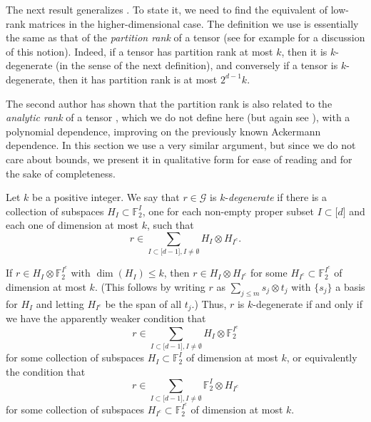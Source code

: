 \documentclass{toc}
\newcommand\F{\mathbb{F}}
\newcommand \cG{\mathcal G}
\newcommand \s{\subset}
\begin{document}
The next result generalizes . To state it, we need to find the equivalent of low-rank matrices in the higher-dimensional case. The definition we use is essentially the same as that of the \emph{partition rank} of a tensor (see for example \cite{lovett} for a discussion of this notion). Indeed, if a tensor has partition rank at most $k$, then it is $k$-degenerate (in the sense of the next definition), and conversely if a tensor is $k$-degenerate, then it has partition rank is at most $2^{d-1}k$.

The second author has shown that the partition rank is also related to the \emph{analytic rank} of a tensor \cite{janzerpranktower,janzerprankpoly}, which we do not define here (but again see \cite{lovett}), with a polynomial dependence, improving on the previously known Ackermann dependence. In this section we use a very similar argument, but since we do not care about bounds, we present it in qualitative form for ease of reading and for the sake of completeness. 

\begin{definition}
  Let $k$ be a positive integer. We say that $r\in \cG$ is $k$-\emph{degenerate} if there is a collection of subspaces $H_I\subset\F_2^I$, one for each non-empty proper subset $I\s \lbrack d\rbrack$ and each one of dimension at most $k$, such that
  \[
    r\in \sum_{I\subset \lbrack d-1 \rbrack,I\neq \emptyset}H_I\otimes H_{I^c}.
  \]
\end{definition}

If $r\in H_I\otimes \F_2^{I^c}$ with $\dim(H_I)\leq k$, then $r\in H_I\otimes H_{I^c}$ for some $H_{I^c}\s \F_2^{I^c}$ of dimension at most $k$. (This follows by writing $r$ as $\sum_{j\leq m} s_j\otimes t_j$ with $\{s_j\}$ a basis for $H_I$ and letting $H_{I^c}$ be the span of all $t_j$.) Thus, $r$ is $k$-degenerate if and only if we have the apparently weaker condition that
\[
  r\in \sum_{I\s \lbrack d-1 \rbrack, I\neq \emptyset} H_I\otimes \F_2^{I^c}
\]
for some collection of subspaces $H_I\s \F_2^{I}$ of dimension at most
$k$, or equivalently the condition that
\[
  r\in \sum_{I\s \lbrack d-1 \rbrack, I\neq \emptyset} \F_2^{I}\otimes
  H_{I^c}
\]
for some collection of subspaces $H_{I^c}\s \F_2^{I^c}$ of dimension
at most $k$.
\end{document}
